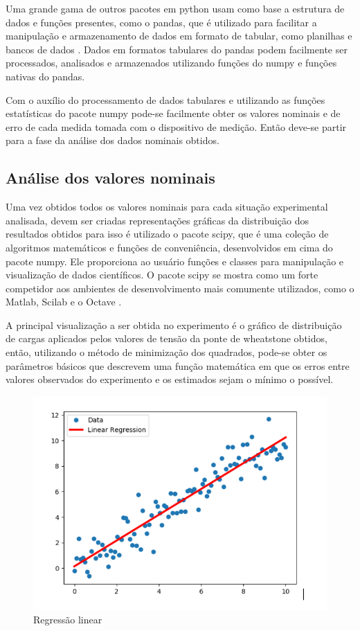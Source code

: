 Uma grande gama de outros pacotes em python usam como base a estrutura de dados e funções presentes, como o pandas, que é utilizado para facilitar a manipulação e armazenamento de dados em formato de tabular, como planilhas e bancos de dados \autocite{DocsPandas}. Dados em formatos tabulares do pandas podem facilmente ser processados, analisados e armazenados utilizando funções do numpy e funções nativas do pandas.

Com o auxílio do processamento de dados tabulares e utilizando as funções estatísticas do pacote numpy pode-se facilmente obter os valores nominais e de erro de cada medida tomada com o dispositivo de medição. Então deve-se partir para a fase da análise dos dados nominais obtidos.

\subsection{Análise dos valores nominais}

Uma vez obtidos todos os valores nominais para cada situação experimental analisada, devem ser criadas representações gráficas da distribuição dos resultados obtidos para isso é utilizado o pacote scipy, que é uma coleção de algoritmos matemáticos e funções de conveniência, desenvolvidos em cima do pacote numpy. Ele proporciona ao usuário funções e classes para manipulação e visualização de dados científicos. O pacote scipy se mostra como um forte competidor aos ambientes de desenvolvimento mais comumente utilizados, como o Matlab, Scilab e o Octave \autocite{DocsSciPy}.

A principal visualização a ser obtida no experimento é o gráfico de distribuição de cargas aplicados pelos valores de tensão da ponte de wheatstone obtidos, então, utilizando o método de minimização dos quadrados, pode-se obter os parâmetros básicos que descrevem uma função matemática em que os erros entre valores observados do experimento e os estimados sejam o mínimo o possível.

\begin{figure}[htb]
	\caption{\label{fig:1160} Regressão linear}
	\begin{center}
		\includegraphics[width=\textwidth]{pictures/1160.png}
	\end{center}
\end{figure}

